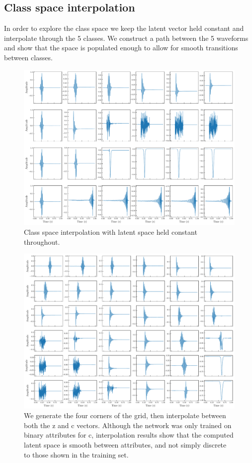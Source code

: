 \documentclass[12pt]{iopart}
\begin{document}
\subsection{Class space interpolation}
In order to explore the class space we keep the latent vector held constant and interpolate through the 5 classes. We construct a path between the 5 waveforms and show that the space is populated enough to allow for smooth transitions between classes. 
\begin{figure}
    \centering
    \includegraphics[width=\textwidth]{figures/fix_z_interp_c.pdf}
    \caption{Class space interpolation with latent space held constant throughout. }
    \label{fig:c_interp}
\end{figure}

\begin{figure}
    \centering
    \includegraphics[width=\textwidth]{figures/4_corners.pdf}
    \caption{We generate the four corners of the grid, then interpolate between both the z and c vectors. Although the network was only trained on binary attributes for c, interpolation results show that the computed latent space is smooth between attributes, and not simply discrete to those shown in the training set.}
    \label{fig:4_c_interp}
\end{figure}
\end{document}
